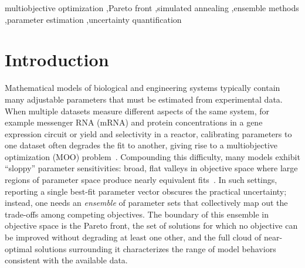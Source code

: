 \documentclass[preprint,review,12pt]{elsarticle}
\begin{document}
\begin{frontmatter}
\begin{abstract}
\textbf{Results:}
A controlled synthetic-data study reveals parameter identifiability structure (individual rate constants off by several-fold yet model predictions accurate to 6--7\%), and a five-replicate coverage analysis confirms that timing features (lag time, time-to-peak) are reliably covered while peak amplitude is systematically overconfident.
Validation against published experimental thrombin generation data from a prothrombin titration study demonstrates that the ensemble predicts held-out conditions to within 1--10\% despite inherent model approximation error.

\textbf{Conclusions:}
ParetoEnsembles.jl provides uncertainty-quantified parameter ensembles that honestly reflect what the data can and cannot constrain, enabling calibrated predictions for downstream analyses including patient-specific simulations.
The package is available under the MIT license at \url{https://github.com/varnerlab/ParetoEnsembles.jl}.
\end{abstract}

\begin{keyword}
multiobjective optimization \sep Pareto front \sep simulated annealing \sep ensemble methods \sep parameter estimation \sep uncertainty quantification
\end{keyword}

\end{frontmatter}

\linenumbers

\section{Introduction}\label{sec:intro}
Mathematical models of biological and engineering systems typically contain many adjustable parameters that must be estimated from experimental data.
When multiple datasets measure different aspects of the same system, for example messenger RNA (mRNA) and protein concentrations in a gene expression circuit or yield and selectivity in a reactor, calibrating parameters to one dataset often degrades the fit to another, giving rise to a multiobjective optimization (MOO) problem~\cite{Miettinen1999,Deb2001,CoelloCoello2007}.
Compounding this difficulty, many models exhibit ``sloppy'' parameter sensitivities: broad, flat valleys in objective space where large regions of parameter space produce nearly equivalent fits~\cite{Gutenkunst2007}.
In such settings, reporting a single best-fit parameter vector obscures the practical uncertainty; instead, one needs an \emph{ensemble} of parameter sets that collectively map out the trade-offs among competing objectives.
The boundary of this ensemble in objective space is the Pareto front, the set of solutions for which no objective can be improved without degrading at least one other, and the full cloud of near-optimal solutions surrounding it characterizes the range of model behaviors consistent with the available data.
\end{document}
